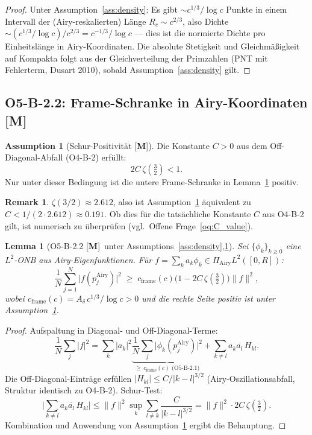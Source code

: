 \documentclass[12pt,a4paper]{amsart}
\newcommand{\statusM}{{\color{green!60!black}[\textbf{M}]}}
\newtheorem{lemma}[theorem]{Lemma}
\theoremstyle{definition}
\newtheorem{assumption}[theorem]{Assumption}
\newtheorem{remark}[theorem]{Remark}
\newcommand{\PiAiry}{\Pi_{\mathrm{Airy}}}
\newcommand{\cframe}{c_{\mathrm{frame}}}
\newcommand{\abs}[1]{\lvert #1 \rvert}
\newcommand{\norm}[1]{\lVert #1 \rVert}
\begin{document}
\begin{proof}
Unter Assumption~\ref{ass:density}: Es gibt $\sim c^{1/3}/\log c$ Punkte
in einem Intervall der (Airy-reskalierten) Länge $R_c \sim c^{2/3}$,
also Dichte $\sim (c^{1/3}/\log c) / c^{2/3} = c^{-1/3}/\log c$ — dies
ist die normierte Dichte pro Einheitslänge in Airy-Koordinaten.
Die absolute Stetigkeit und Gleichmäßigkeit auf Kompakta
folgt aus der Gleichverteilung der Primzahlen (PNT mit Fehlerterm,
Dusart 2010), sobald Assumption~\ref{ass:density} gilt.
\end{proof}

\subsection{O5-B-2.2: Frame-Schranke in Airy-Koordinaten \statusM}
\label{sec:O5B22}

\begin{assumption}[Schur-Positivität \statusM]
\label{ass:schur}
Die Konstante $C > 0$ aus dem Off-Diagonal-Abfall (O4-B-2) erfüllt:
\[
  2C\,\zeta\!\left(\tfrac{3}{2}\right) < 1.
\]
Nur unter dieser Bedingung ist die untere Frame-Schranke in Lemma~\ref{lem:O5B22}
positiv.
\end{assumption}

\begin{remark}
$\zeta(3/2) \approx 2.612$, also ist Assumption~\ref{ass:schur}
äquivalent zu $C < 1/(2 \cdot 2.612) \approx 0.191$.
Ob dies für die tatsächliche Konstante $C$ aus O4-B-2 gilt,
ist numerisch zu überprüfen (vgl.\ Offene Frage~\ref{oq:C_value}).
\end{remark}

\begin{lemma}[O5-B-2.2 \statusM\ unter Assumptions~\ref{ass:density},\ref{ass:schur}]
\label{lem:O5B22}
Sei $\{\phi_k\}_{k\ge 0}$ eine $L^2$-ONB aus Airy-Eigenfunktionen.
Für $f = \sum_k a_k\phi_k \in \PiAiry L^2([0,R])$:
\[
  \frac{1}{N}\sum_{j=1}^N \abs{f(p_j^{\mathrm{Airy}})}^2
  \;\ge\;
  \cframe(c)\bigl(1 - 2C\,\zeta\!\left(\tfrac{3}{2}\right)\bigr)\norm{f}^2,
\]
wobei $\cframe(c) = A_\delta\,c^{1/3}/\log c > 0$
und die rechte Seite positiv ist unter Assumption~\ref{ass:schur}.
\end{lemma}

\begin{proof}
Aufspaltung in Diagonal- und Off-Diagonal-Terme:
\[
  \frac{1}{N}\sum_j \abs{f}^2
  = \sum_k \abs{a_k}^2 \underbrace{\frac{1}{N}\sum_j \abs{\phi_k(p_j^{\mathrm{Airy}})}^2}_{\ge\,\cframe(c)\text{ (O5-B-2.1)}}
  + \sum_{k\ne l} a_k\overline{a_l}\,H_{kl}.
\]
Die Off-Diagonal-Einträge erfüllen $\abs{H_{kl}} \le C/\abs{k-l}^{3/2}$
(Airy-Oszillationsabfall, Struktur identisch zu O4-B-2).
Schur-Test:
\[
  \abs{\sum_{k\ne l} a_k\overline{a_l}\,H_{kl}}
  \le \norm{f}^2 \sup_k \sum_{l\ne k}\frac{C}{\abs{k-l}^{3/2}}
  = \norm{f}^2 \cdot 2C\,\zeta\!\left(\tfrac{3}{2}\right).
\]
Kombination und Anwendung von Assumption~\ref{ass:schur}
ergibt die Behauptung.
\end{proof}
\end{document}
